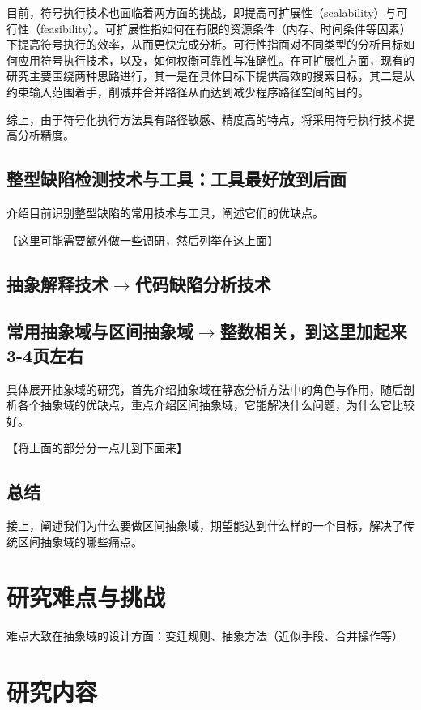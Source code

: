  目前，符号执行技术也面临着两方面的挑战，即提高可扩展性（scalability）与可行性（feasibility）。可扩展性指如何在有限的资源条件（内存、时间条件等因素）下提高符号执行的效率，从而更快完成分析。可行性指面对不同类型的分析目标如何应用符号执行技术，以及，如何权衡可靠性与准确性。在可扩展性方面，现有的研究主要围绕两种思路进行，其一是在具体目标下提供高效的搜索目标，其二是从约束输入范围着手，削减并合并路径从而达到减少程序路径空间的目的。
 
 综上，由于符号化执行方法具有路径敏感、精度高的特点，将采用符号执行技术提高分析精度。
 
 \subsection{整型缺陷检测技术与工具：工具最好放到后面}
 
 介绍目前识别整型缺陷的常用技术与工具，阐述它们的优缺点。
 
 【这里可能需要额外做一些调研，然后列举在这上面】
 
 \subsection{抽象解释技术$\rightarrow$代码缺陷分析技术}
 
 
 \subsection{常用抽象域与区间抽象域$\rightarrow$整数相关，到这里加起来3-4页左右}
 
 具体展开抽象域的研究，首先介绍抽象域在静态分析方法中的角色与作用，随后剖析各个抽象域的优缺点，重点介绍区间抽象域，它能解决什么问题，为什么它比较好。
 
 【将上面的部分分一点儿到下面来】
 
 \subsection{总结}
 
 接上，阐述我们为什么要做区间抽象域，期望能达到什么样的一个目标，解决了传统区间抽象域的哪些痛点。
 
 \section{研究难点与挑战}
 
 难点大致在抽象域的设计方面：变迁规则、抽象方法（近似手段、合并操作等）
 
 \section{研究内容}
 
